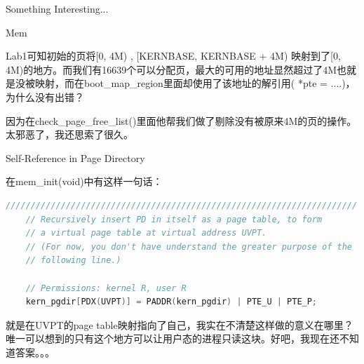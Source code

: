 \documentclass[GBK,winfonts,a4paper,10pt]{ctexart}
\begin{document}
\begin{section}{ Something Interesting... }
\begin{subsection}{ Mem }
\par
 Lab1可知初始的页将[0, 4M) , [KERNBASE, KERNBASE + 4M) 映射到了[0, 4M)的地方。而我们有16639个可以分配页，最大的可用的地址显然超过了4M也就是没被映射，而在boot\_map\_region里面却使用了该地址的解引用( *pte = ....)，为什么没有出错？
\par
因为在check\_page\_free\_list()里面他帮我们做了剔除没有被原来4M的页的操作。 太邪恶了，我还思索了很久。
\end{subsection}

\begin{subsection}{ Self-Reference in Page Directory }
\par
在mem\_init(void)中有这样一句话：
\begin{lstlisting}[language=C]
	//////////////////////////////////////////////////////////////////////
	// Recursively insert PD in itself as a page table, to form
	// a virtual page table at virtual address UVPT.
	// (For now, you don't have understand the greater purpose of the
	// following line.)

	// Permissions: kernel R, user R
	kern_pgdir[PDX(UVPT)] = PADDR(kern_pgdir) | PTE_U | PTE_P;
\end{lstlisting}
\par
就是在UVPT的page table映射指向了自己，我实在不清楚这样做的意义在哪里？唯一可以想到的只有这个地方可以让用户态的进程只读这块。好吧，我现在还不知道答案。。。
\end{subsection}

\end{section}
\end{document}
